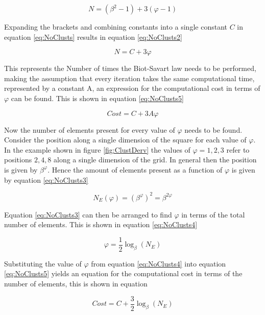 \begin{equation}
\label{eq:NoClusts}
N=(\beta^2-1)+3(\varphi-1)
\end{equation}

Expanding the brackets and combining constants into a single constant $C$ in equation \ref{eq:NoClusts} results in equation \ref{eq:NoClusts2} 

\begin{equation}
\label{eq:NoClusts2}
N=C+3\varphi
\end{equation}

This represents the Number of times the Biot-Savart law needs to be performed, making the assumption that every iteration takes the same computational time, represented by a constant A, an expression for the computational cost in terms of $\varphi$ can be found. This is shown in equation \ref{eq:NoClusts5}

\begin{equation}
\label{eq:NoClusts5}
Cost=C+3A\varphi
\end{equation}

Now the number of elements present for every value of $\varphi$ needs to be found. Consider the position along a single dimension of the square for each value of $\varphi$. In the example shown in figure \ref{fig:ClustDerv} the values of $\varphi = 1, 2, 3$ refer to positions $2,4,8$ along a single dimension of the grid. In general then the position is given by $\beta^\varphi$. Hence the amount of elements present as a function of $\varphi$ is given by equation \ref{eq:NoClusts3} 

\begin{equation}
\label{eq:NoClusts3}
N_{E}(\varphi)=(\beta^\varphi)^2=\beta^{2\varphi}
\end{equation}

Equation \ref{eq:NoClusts3} can then be arranged to find $\varphi$ in terms of the total number of elements. This is shown in equation \ref{eq:NoClusts4}

\begin{equation}
\label{eq:NoClusts4}
\varphi=\frac{1}{2}\log_{\beta}(N_E)
\end{equation}

Substituting the value of $\varphi$ from equation \ref{eq:NoClusts4} into equation \ref{eq:NoClusts5} yields an equation for the computational cost in terms of the number of elements, this is shown in equation

\begin{equation}
\label{eq:NoClusts6}
Cost=C+\frac{3}{2}\log_{\beta}(N_E)
\end{equation}

